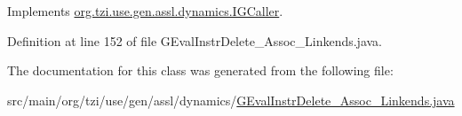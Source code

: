Implements \hyperlink{interfaceorg_1_1tzi_1_1use_1_1gen_1_1assl_1_1dynamics_1_1_i_g_caller_a8dc6abb36ee44d8e73a0b506764bd1e1}{org.\-tzi.\-use.\-gen.\-assl.\-dynamics.\-I\-G\-Caller}.



Definition at line 152 of file G\-Eval\-Instr\-Delete\-\_\-\-Assoc\-\_\-\-Linkends.\-java.



The documentation for this class was generated from the following file\-:\begin{DoxyCompactItemize}
\item 
src/main/org/tzi/use/gen/assl/dynamics/\hyperlink{_g_eval_instr_delete___assoc___linkends_8java}{G\-Eval\-Instr\-Delete\-\_\-\-Assoc\-\_\-\-Linkends.\-java}\end{DoxyCompactItemize}
